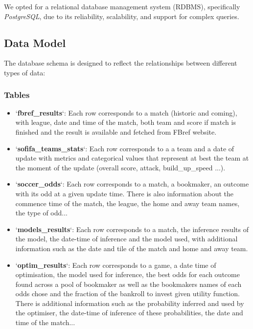 We opted for a relational database management system (RDBMS), specifically \textit{PostgreSQL}, due to its reliability, scalability, and support for complex queries.

\subsection{Data Model}

The database schema is designed to reflect the relationships between different types of data:

\subsubsection{Tables}

\begin{itemize}
    \item `\textbf{fbref\_results}`: Each row corresponds to a match (historic and coming), with league, date and time of the match, both team and score if match is finished and the result is available and fetched from FBref website.
    \item `\textbf{sofifa\_teams\_stats}`: Each row corresponds to a a team and a date of update with metrics and categorical values that represent at best the team at the moment of the update (overall score, attack, build\_up\_speed ...).
    \item `\textbf{soccer\_odds}`: Each row corresponds to a match, a bookmaker, an outcome with its odd at a given update time. There is also information about the commence time of the match, the league, the home and away team names, the type of odd...
    \item `\textbf{models\_results}`: Each row corresponds to a match, the inference results of the model, the date-time of inference and the model used, with additional information such as the date and tile of the match and home and away team.
    \item `\textbf{optim\_results}`: Each row corresponds to a game, a date time of optimisation, the model used for inference, the best odds for each outcome found across a pool of bookmaker as well as the bookmakers names of each odds chose and the fraction of the bankroll to invest given utility function. There is additional information such as the probability inferred and used by the optimiser, the date-time of inference of these probabilities, the date and time of the match...
\end{itemize}


